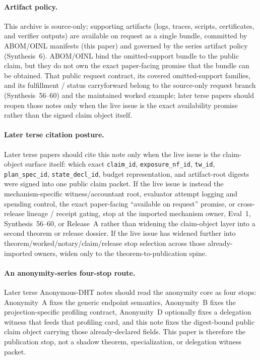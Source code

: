 \documentclass[11pt]{article}
\begin{document}
\paragraph{Artifact policy.} This archive is source-only; supporting artifacts (logs, traces, scripts, certificates, and verifier outputs) are available on request as a single bundle, committed by ABOM/OINL manifests (this paper) and governed by the series artifact policy (Synthesis~6).\cite{series:artifactpolicy}
ABOM/OINL bind the omitted-support bundle to the public claim, but they do not own the exact paper-facing promise that the bundle can be obtained. That public request contract, its covered omitted-support families, and its fulfillment / status carryforward belong to the source-only request branch (Synthesis~56--60) and the maintained worked example; later terse papers should reopen those notes only when the live issue is the exact availability promise rather than the signed claim object itself.\cite{series:publicrequestcontracts,series:requestableevidenceclasses,series:requestfulfillmentcertificates,series:publicrequeststatusenvelopes,series:publicrequestcarryforward,series:workedexample}

\paragraph{Later terse citation posture.} Later terse papers should cite this note only when the live issue is the claim-object surface itself: which exact \texttt{claim\_id}, \texttt{exposure\_nf\_id}, \texttt{tw\_id}, \texttt{plan\_spec\_id}, \texttt{state\_decl\_id}, budget representation, and artifact-root digests were signed into one public claim packet. If the live issue is instead the mechanism-specific witness/accountant root, evaluator attempt logging and spending control, the exact paper-facing ``available on request'' promise, or cross-release lineage / receipt gating, stop at the imported mechanism owner, Eval~1, Synthesis~56--60, or Release~A rather than widening the claim-object layer into a second theorem or release dossier. If the live issue has widened further into theorem/worked/notary/claim/release stop selection across those already-imported owners, widen only to the theorem-to-publication spine.\cite{series:evalnotary,series:publicrequestcontracts,series:publicrequeststatusenvelopes,series:publicrequestcarryforward,series:releaseproperty,series:theoremtopublicationspine}

\paragraph{An anonymity-series four-stop route.}
Later terse Anonymous-DHT notes should read the anonymity core as four stops: Anonymity~A fixes the generic endpoint semantics, Anonymity~B fixes the projection-specific profiling contract, Anonymity~D optionally fixes a delegation witness that feeds that profiling card, and this note fixes the digest-bound public claim object carrying those already-declared fields. This paper is therefore the publication stop, not a shadow theorem, specialization, or delegation witness packet.\cite{series:profiling,series:spectral2budget}
\end{document}
